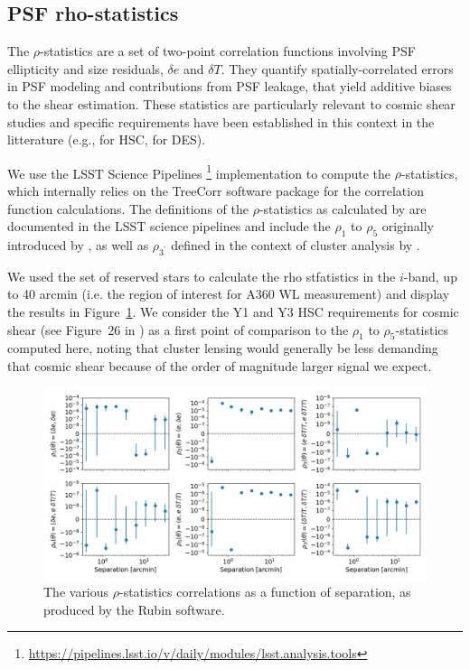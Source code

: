 \documentclass[SE,lsstdraft,authoryear,toc]{lsstdoc}
\begin{document}
\subsection{PSF rho-statistics}
The $\rho$-statistics \citep{2010MNRAS.404..350R, 2016MNRAS.460.2245J} are a set of two-point correlation functions involving PSF ellipticity and size residuals, $\delta e$ and $\delta T$. They quantify spatially-correlated errors in PSF modeling and contributions from PSF leakage, that yield additive biases to the shear estimation. These statistics are particularly relevant to cosmic shear studies and specific requirements have been established in this context in the litterature (e.g., \citealp{2018PASJ...70S..25M, 2022PASJ...74..421L} for HSC,  \citealp{2018MNRAS.481.1149Z, 2021MNRAS.504.4312G} for DES). 

We use the LSST Science Pipelines \footnote{\url{https://pipelines.lsst.io/v/daily/modules/lsst.analysis.tools}} implementation to compute the $\rho$-statistics, which internally relies on the TreeCorr software package \citep{2015ascl.soft08007J} for the correlation function calculations. The definitions of the $\rho$-statistics as calculated by  are documented in the LSST science pipelines and include the $\rho_1$ to $\rho_5$ originally introduced by \citet{2010MNRAS.404..350R, 2016MNRAS.460.2245J}, as well as $\rho_{3^\prime}$ defined in the context of cluster analysis by \citet{2015MNRAS.449.2219M}.

We used the set of reserved stars to calculate the rho stfatistics in the $i$-band, up to 40 arcmin (i.e. the region of interest for A360 WL measurement) and display the results in Figure~\ref{fig:rho_stat}. We consider the Y1 and Y3 HSC requirements for cosmic shear (see Figure~26 in \citealp{2022PASJ...74..421L}) as a first point of comparison to the $\rho_1$ to $\rho_5$-statistics computed here, noting that cluster lensing would generally be less demanding that cosmic shear because of the order of magnitude larger signal we expect. 



\begin{figure}
\centering
\includegraphics[width=\textwidth]{Figures/rho_stat_noband.png}
\caption{The various $\rho$-statistics correlations as a function of separation, as produced by the Rubin  software.\label{fig:rho_stat}}
\end{figure}
\end{document}
